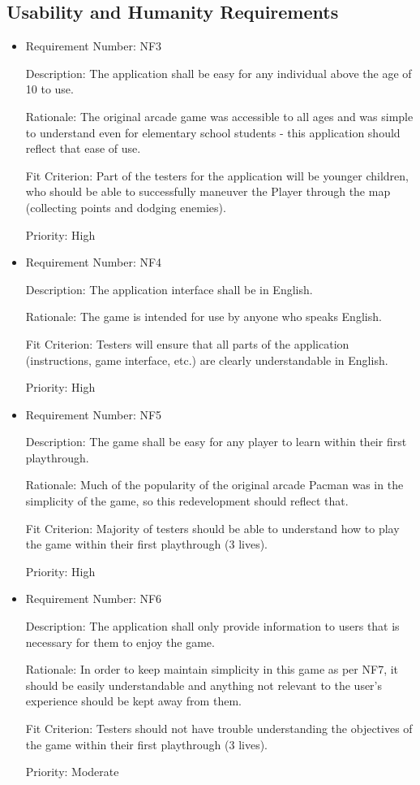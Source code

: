 \documentclass[12pt, titlepage]{article}
\begin{document}
\subsection{Usability and Humanity Requirements}
\begin{itemize}
	\item
	Requirement Number: \hypertarget{nf3}{NF3}

	Description: The application shall be easy for any individual above the age of 10 to use.

	Rationale: The original arcade game was accessible to all ages and was simple to understand even for elementary school students - this application should reflect that ease of use.

	Fit Criterion: Part of the testers for the application will be younger children, who should be able to successfully maneuver the Player through the map (collecting points and dodging enemies).

	Priority: High

	\item
	Requirement Number: \hypertarget{nf4}{NF4}

	Description: The application interface shall be in English.

	Rationale: The game is intended for use by anyone who speaks English.

	Fit Criterion: Testers will ensure that all parts of the application (instructions, game interface, etc.) are clearly understandable in English.

	Priority: High

	\item
	Requirement Number: \hypertarget{nf5}{NF5}

	Description: The game shall be easy for any player to learn within their first playthrough.

	Rationale: Much of the popularity of the original arcade Pacman was in the simplicity of the game, so this redevelopment should reflect that.

	Fit Criterion: Majority of testers should be able to understand how to play the game within their first playthrough (3 lives).

	Priority: High

	\item
	Requirement Number: \hypertarget{nf6}{NF6}

	Description: The application shall only provide information to users that is necessary for them to enjoy the game.

	Rationale: In order to keep maintain simplicity in this game as per NF7, it should be easily understandable and anything not relevant to the user's experience should be kept away from them.

	Fit Criterion: Testers should not have trouble understanding the objectives of the game within their first playthrough (3 lives).

	Priority: Moderate
\end{itemize}
\end{document}
